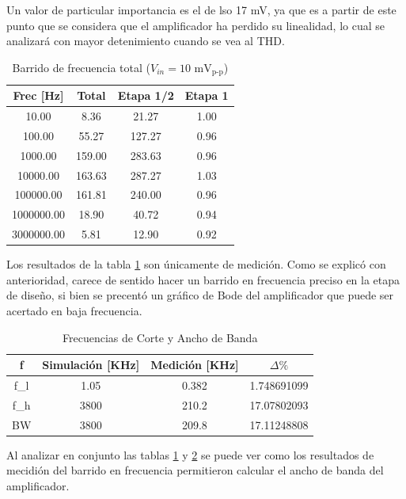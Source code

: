 Un valor de particular importancia es el de lso 17 mV, ya que es a partir de este punto que se considera que el amplificador ha perdido su linealidad, lo cual se analizará con mayor detenimiento cuando se vea al THD.

\begin{table}[H]
\centering
\begin{tabular}{|c|c|c|c|}
\hline
\textbf{Frec [Hz]} & \textbf{Total} & \textbf{Etapa 1/2} & \textbf{Etapa 1} \\ \hline
10.00 & 8.36 & 21.27 & 1.00 \\ \hline
100.00 & 55.27 & 127.27 & 0.96 \\ \hline
1000.00 & 159.00 & 283.63 & 0.96 \\ \hline
10000.00 & 163.63 & 287.27 & 1.03 \\ \hline
100000.00 & 161.81 & 240.00 & 0.96 \\ \hline
1000000.00 & 18.90 & 40.72 & 0.94 \\ \hline
3000000.00 & 5.81 & 12.90 & 0.92 \\ \hline
\end{tabular}
\caption{Barrido de frecuencia total ($V_{in} = 10\text{ mV}_{\text{p-p}}$)}
\label{tab:barrido_frec_total}
\end{table}

Los resultados de la tabla \ref{tab:barrido_frec_total} son únicamente de medición. Como se explicó con anterioridad, carece de sentido hacer un barrido en frecuencia preciso en la etapa de diseño, si bien se precentó un gráfico de Bode del amplificador que puede ser acertado en baja frecuencia.

\begin{table}[H]
\centering
\begin{tabular}{|c|c|c|c|}
\hline
\textbf{f} & \textbf{Simulación [KHz]} & \textbf{Medición [KHz]} & $\Delta \%$ \\ \hline
f_l & 1.05 & 0.382 & 1.748691099 \\ \hline
f_h & 3800 & 210.2 & 17.07802093 \\ \hline
BW  & 3800 & 209.8 & 17.11248808  \\ \hline
\end{tabular}
\caption{Frecuencias de Corte y Ancho de Banda}
\label{tab:frecuencias}
\end{table}

Al analizar en conjunto las tablas \ref{tab:barrido_frec_total} y \ref{tab:frecuencias} se puede ver como los resultados de mecidión del barrido en frecuencia permitieron calcular el ancho de banda del amplificador.

